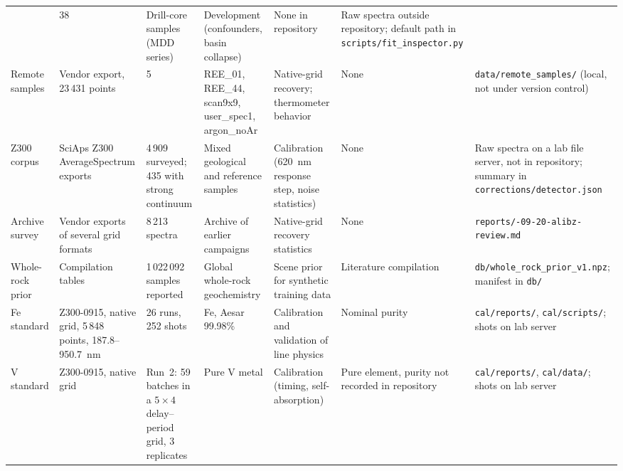 \begin{table}[t]
\begin{tabular}{@{}p{1.05cm}p{2.7cm}p{1.3cm}p{2.3cm}p{1.7cm}p{2.6cm}p{3.2cm}@{}}
 & 38 %
 & Drill-core samples (MDD series) & Development (confounders, basin collapse) & None in repository & Raw spectra outside repository; default path in \texttt{scripts/\allowbreak fit\_\allowbreak inspector.py} \\
Remote samples & Vendor export, 23\,431 points %
 & 5 & REE\_01, REE\_44, scan9x9, user\_spec1, argon\_noAr & Native-grid recovery; thermometer behavior & None & \texttt{data/\allowbreak remote\_\allowbreak samples/\allowbreak } (local, not under version control) \\
Z300 corpus & SciAps Z300 AverageSpectrum exports & 4\,909 surveyed; 435 with strong continuum %
 & Mixed geological and reference samples & Calibration (620~nm response step, noise statistics) & None & Raw spectra on a lab file server, not in repository; summary in \texttt{corrections/\allowbreak detector.json} \\
Archive survey & Vendor exports of several grid formats & 8\,213 spectra %
 & Archive of earlier campaigns & Native-grid recovery statistics & None & \texttt{reports/\allowbreak 2026-09-20-alibz-review.md} \\
Whole-rock prior & Compilation tables & 1\,022\,092 samples reported %
 & Global whole-rock geochemistry & Scene prior for synthetic training data & Literature compilation & \texttt{db/\allowbreak whole\_\allowbreak rock\_\allowbreak prior\_\allowbreak v1.npz}; manifest in \texttt{db/\allowbreak } \\
Fe standard & Z300-0915, native grid, 5\,848 points, 187.8--\SI{950.7}{\nano\metre} %
 & 26 runs, 252 shots %
 & Fe, Aesar 99.98\% %
 & Calibration and validation of line physics & Nominal purity & \texttt{cal/\allowbreak reports/\allowbreak }, \texttt{cal/\allowbreak scripts/\allowbreak }; shots on lab server \\
V standard & Z300-0915, native grid & Run~2: 59 batches in a $5\times4$ delay--period grid, 3 replicates %
 & Pure V metal & Calibration (timing, self-absorption) & Pure element, purity not recorded in repository & \texttt{cal/\allowbreak reports/\allowbreak }, \texttt{cal/\allowbreak data/\allowbreak }; shots on lab server \\
\bottomrule
\end{tabular}
\end{table}

